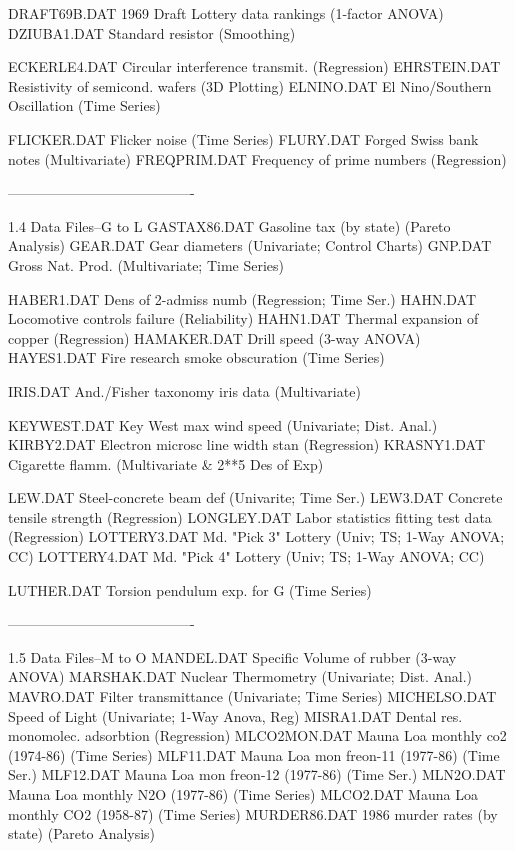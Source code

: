       DRAFT69B.DAT  1969 Draft Lottery data rankings (1-factor ANOVA)
      DZIUBA1.DAT   Standard resistor (Smoothing)
 
      ECKERLE4.DAT  Circular interference transmit. (Regression)
      EHRSTEIN.DAT  Resistivity of semicond. wafers (3D Plotting)
      ELNINO.DAT    El Nino/Southern Oscillation (Time Series)
 
      FLICKER.DAT   Flicker noise (Time Series)
      FLURY.DAT     Forged Swiss bank notes (Multivariate)
      FREQPRIM.DAT  Frequency of prime numbers (Regression)
 
 
----------------------------------------
 
1.4
Data Files--G to L
      GASTAX86.DAT  Gasoline tax (by state) (Pareto Analysis)
      GEAR.DAT      Gear diameters (Univariate; Control Charts)
      GNP.DAT       Gross Nat. Prod. (Multivariate; Time Series)
 
      HABER1.DAT    Dens of 2-admiss numb (Regression; Time Ser.)
      HAHN.DAT      Locomotive controls failure (Reliability)
      HAHN1.DAT     Thermal expansion of copper (Regression)
      HAMAKER.DAT   Drill speed (3-way ANOVA)
      HAYES1.DAT    Fire research smoke obscuration (Time Series)
 
      IRIS.DAT      And./Fisher taxonomy iris data (Multivariate)
 
      KEYWEST.DAT   Key West max wind speed (Univariate; Dist. Anal.)
      KIRBY2.DAT    Electron microsc line width stan (Regression)
      KRASNY1.DAT   Cigarette flamm. (Multivariate & 2**5 Des of Exp)
 
      LEW.DAT       Steel-concrete beam def (Univarite; Time Ser.)
      LEW3.DAT      Concrete tensile strength (Regression)
      LONGLEY.DAT   Labor statistics fitting test data (Regression)
      LOTTERY3.DAT  Md. "Pick 3" Lottery (Univ; TS; 1-Way ANOVA; CC)
      LOTTERY4.DAT  Md. "Pick 4" Lottery (Univ; TS; 1-Way ANOVA; CC)
 
      LUTHER.DAT    Torsion pendulum exp. for G (Time Series)
 
 
 
 
----------------------------------------
 
1.5
Data Files--M to O
      MANDEL.DAT    Specific Volume of rubber (3-way ANOVA)
      MARSHAK.DAT   Nuclear Thermometry    (Univariate; Dist. Anal.)
      MAVRO.DAT     Filter transmittance (Univariate; Time Series)
      MICHELSO.DAT  Speed of Light (Univariate; 1-Way Anova, Reg)
      MISRA1.DAT    Dental res. monomolec. adsorbtion (Regression)
      MLCO2MON.DAT  Mauna Loa monthly co2 (1974-86) (Time Series)
      MLF11.DAT     Mauna Loa mon freon-11 (1977-86) (Time Ser.)
      MLF12.DAT     Mauna Loa mon freon-12 (1977-86) (Time Ser.)
      MLN2O.DAT     Mauna Loa monthly N2O (1977-86) (Time Series)
      MLCO2.DAT     Mauna Loa monthly CO2 (1958-87) (Time Series)
      MURDER86.DAT  1986 murder rates (by state) (Pareto Analysis)
 
